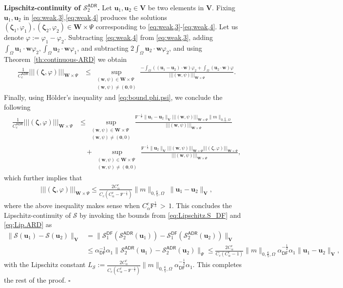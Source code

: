\documentclass[11pt, reqno, a4paper, twoside]{article}
\newcommand*\tnorm[1]{|\!|\!| #1 |\!|\!|}
\newcommand{\bu}{\boldsymbol{u}}
\newcommand{\bw}{\boldsymbol{w}}
\newcommand\bzeta{\boldsymbol{\zeta}}
\newcommand\bzero{\boldsymbol{0}}
\newcommand{\rF}{\mathtt{F}}
\newcommand{\bW}{\mathbf{W}}
\newcommand{\bV}{\mathbf{V}}
\newcommand{\cS}{\mathcal{S}}
\newenvironment{proof}{\noindent{\it Proof.}}{\hfill$\square$}
\numberwithin{equation}{section}
\numberwithin{remark}{section}
\numberwithin{figure}{section}
\numberwithin{table}{section}
\begin{document}
{\begin{proof}
\smallskip
\noindent\textbf{Lipschitz-continuity of \(\cS^{\mathsf{ADR}}_2\).}
{Let $\bu_1, \bu_2\in\bV$ be two elements in $\bV.$ Fixing $\bu_1, \bu_2$ in \eqref{eq:weak,3},\eqref{eq:weak,4} produces the solutions $(\bzeta_1,\varphi_1), (\bzeta_2,\varphi_2)\in\bW\times\Psi$ corresponding to  \eqref{eq:weak,3}-\eqref{eq:weak,4}. Let us denote $\varphi:=\varphi_1-\varphi_2.$}  Subtracting \eqref{eq:weak,4} from \eqref{eq:weak,3}, adding {$\int_{\Omega}\bu_1\cdot\bw\varphi_2, \int_{\Omega}\bu_2\cdot\bw\varphi_1$,} and subtracting {$2\int_{\Omega}\bu_2\cdot\bw\varphi_2$}, and using Theorem~\ref{th:continuous-ARD}  we obtain
\begin{align*}
   \frac1{C^{\mathsf{ADR}}_{c}} \tnorm{(\bzeta,\varphi)}_{\bW\times\Psi}&\leq\sup_{\substack{(\bw,\psi)\in\bW\times \Psi\\(\bw,\psi)\neq (\bzero,0)}}\frac{{-\int_{\Omega}((\bu_1-\bu_2)\cdot\bw)\varphi_2 + \int_{\Omega}(\bu_2\cdot\bw)\varphi}}{\tnorm{(\bw,\psi)}_{\bW\times \Psi}}.
    \end{align*}
    Finally, using H\"{o}lder's inequality and \eqref{eq:bound.phi.psi}, we conclude the following 
  {  \begin{align}\label{eq:Lip.ARD}
   \frac1{C^{\mathsf{ADR}}_{c}}\tnorm{(\bzeta,\varphi)}_{\bW\times\Psi}&\leq\sup_{\substack{(\bw,\psi)\in\bW\times \Psi\\(\bw,\psi)\neq (\bzero,0)}}\frac{{\rF^{-\frac13}}\|\bu_1-\bu_2\|_{\bV} \tnorm{(\bw,\psi)}_{\bW\times\Psi}\|m\|_{0,\frac65,\Omega}}{{\tnorm{(\bw,\psi)}_{\bW\times \Psi}}}\nonumber\\&\quad +\sup_{\substack{(\bw,\psi)\in\bW\times \Psi\\(\bw,\psi)\neq (\bzero,0)}}\frac{{\rF^{-\frac13}}\|\bu_2\|_{\bV}\tnorm{(\bw,\psi)}_{\bW\times\Psi}\tnorm{(\bzeta,\varphi)}_{\bW\times\Psi}}{{\tnorm{(\bw,\psi)}_{\bW\times \Psi}}},\nonumber
\end{align}
which further implies that 
\begin{align}
    \tnorm{(\bzeta,\varphi)}_{\bW\times\Psi} 
    \leq {\frac{2C^c_{\alpha}}{C_c(C^c_{\alpha}-\rF^{-\frac13})}}\|m\|_{0,\frac65,\Omega}\; \|\bu_1-\bu_2\|_{\bV},
\end{align}
where the above inequality makes sense when $C^c_{\alpha}\rF^{\frac13} \,>\, 1.$ 
This concludes the Lipschitz-continuity 
of \(\cS\) by invoking the bounds from \eqref{eq:Lipschitz.S_DF} and \eqref{eq:Lip.ARD} as 
{\begin{align}\label{eq:Lipschitz.S_ARD} \|\cS(\bu_1)-\cS(\bu_2)\|_{\bV}&=\|\cS_1^{\mathsf{DF}}(\cS_2^{\mathsf{ADR}}(\bu_1))-\cS_1^{\mathsf{DF}}(\cS_2^{\mathsf{ADR}}(\bu_2))\|_{\bV}\\&\leq\alpha_{\mathsf{DF}}^{-1}\alpha_1\|\cS_2^{\mathsf{ADR}}(\bu_1)-\cS_2^{\mathsf{ADR}}(\bu_2)\|_{\Psi}\nonumber\leq \frac{2C^c_{\alpha}}{C_c(C^c_{\alpha}-1)}\|m\|_{0,\frac65,\Omega}\alpha_{\mathsf{DF}}^{-\frac12}\alpha_1\|\bu_1-\bu_2\|_{\bV},
\end{align}}
with the Lipschitz constant {\(L_{\cS}:={\frac{2C^c_{\alpha}}{C_c(C^c_{\alpha}-\rF^{-\frac13})}}\|m\|_{0,\frac65,\Omega}\alpha_{\mathsf{DF}}^{-\frac12}\alpha_1.\)}}
This completes the rest of the proof.
\end{proof}

}
\end{document}
